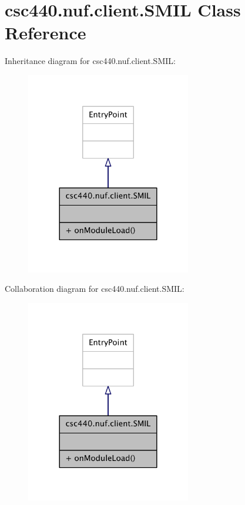 \hypertarget{classcsc440_1_1nuf_1_1client_1_1_s_m_i_l}{\section{csc440.\-nuf.\-client.\-S\-M\-I\-L Class Reference}
\label{classcsc440_1_1nuf_1_1client_1_1_s_m_i_l}
}


Inheritance diagram for csc440.\-nuf.\-client.\-S\-M\-I\-L\-:
\nopagebreak
\begin{figure}[H]
\begin{center}
\leavevmode
\includegraphics[width=204pt]{classcsc440_1_1nuf_1_1client_1_1_s_m_i_l__inherit__graph}
\end{center}
\end{figure}


Collaboration diagram for csc440.\-nuf.\-client.\-S\-M\-I\-L\-:
\nopagebreak
\begin{figure}[H]
\begin{center}
\leavevmode
\includegraphics[width=204pt]{classcsc440_1_1nuf_1_1client_1_1_s_m_i_l__coll__graph}
\end{center}
\end{figure}
